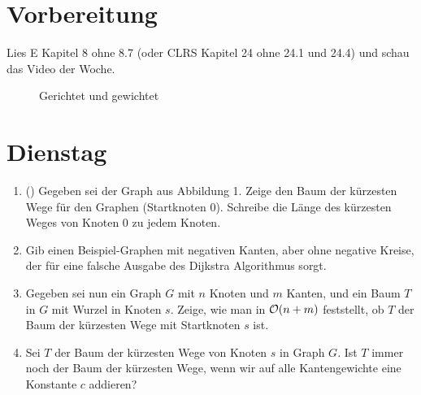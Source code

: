\documentclass{uebung_cs}
\begin{document}
\section*{Vorbereitung}
Lies E Kapitel 8 ohne 8.7 (oder CLRS Kapitel 24 ohne 24.1 und 24.4) und schau das Video der Woche.

\vspace*{20pt}
\begin{figure}[h]
	\begin{center}
		\caption{Gerichtet und gewichtet}
		\label{digraph}
	\end{center}
\end{figure}

\section*{Dienstag}
\begin{aufgabe}\label{tue-first}
	\begin{enumerate}
		\item (\warmup) Gegeben sei der Graph aus Abbildung 1.
		Zeige den Baum der kürzesten Wege für den Graphen (Startknoten 0).
		Schreibe die Länge des kürzesten Weges von Knoten 0 zu jedem Knoten.
		\item Gib einen Beispiel-Graphen mit negativen Kanten, aber ohne negative Kreise, der für eine falsche Ausgabe des Dijkstra Algorithmus sorgt.
		\item Gegeben sei nun ein Graph $G$ mit $n$ Knoten und $m$ Kanten, und ein Baum $T$ in $G$ mit Wurzel in Knoten $s$.
		Zeige, wie man in $\mathcal{O} (n+m)$ feststellt, ob $T$ der Baum der kürzesten Wege mit Startknoten $s$ ist.
		\item Sei $T$ der Baum der kürzesten Wege von Knoten $s$ in Graph $G$.
		Ist $T$ immer noch der Baum der kürzesten Wege, wenn wir auf alle Kantengewichte eine Konstante $c$ addieren?
	\end{enumerate}
\end{aufgabe}
\end{document}
